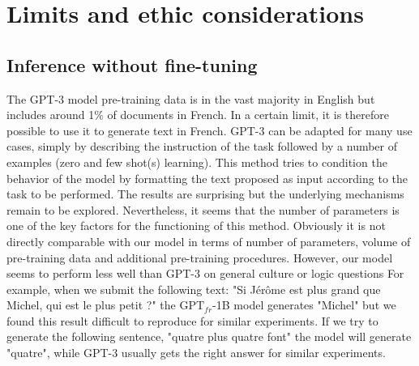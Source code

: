 \section{Limits and ethic considerations}

\subsection{Inference without fine-tuning}  

The GPT-3 model \parencite{brown_20} pre-training data is in the vast majority in English but includes around 1\% of documents in French. In a certain limit, it is therefore possible to use it to generate text in French. GPT-3 can be adapted for many use cases, simply by describing the instruction of the task followed by a number of examples (zero and few shot(s) learning). This method tries to condition the behavior of the model by formatting the text proposed as input according to the task to be performed. The results are surprising but the underlying mechanisms remain to be explored. Nevertheless, it seems that the number of parameters is one of the key factors for the functioning of this method. Obviously it is not directly comparable with our model in terms of number of parameters, volume of pre-training data and additional pre-training procedures. However, our model seems to perform less well than GPT-3 on general culture or logic questions
For example, when we submit the following text: "Si Jérôme est plus grand que Michel, qui est le plus petit ?"
the $\text{GPT}_{fr}$-1B model generates "Michel" but we found this result difficult to reproduce for similar experiments. If we try to generate the following sentence, "quatre plus quatre font" the model will generate "quatre", while GPT-3 usually gets the right answer for similar experiments.

